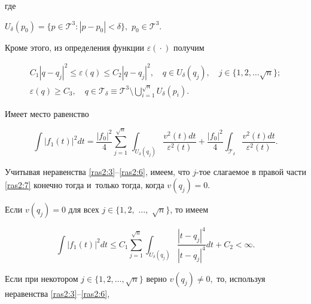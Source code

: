 где

$ U_\delta(p_0) = \{p \in {\mathcal T}^3 : |p-p_0| < \delta\},$ $p_0 \in {\mathcal T}^3$.





Кроме этого, из определения функции $\varepsilon({}\cdot{})$ получим

\begin{gather}

C_1|q-q_j|^2 \leq \varepsilon(q) \leq C_2|q-q_j|^2,\quad q\in U_\delta(q_j),\quad j\in \{1, 2, \dots \sqrt{n}\};

\label{ras2:5}

\\

\varepsilon(q)\geq C_3,\quad q\in {\mathcal T}_{\delta} \equiv {\mathcal T}^3 \setminus \bigcup\limits_{i=1}^{\sqrt{n}} U_\delta(p_i).

\label{ras2:6}

\end{gather}



Имеет место равенство

\begin{equation}

\int |f_1(t)|^2dt=\frac{|f_0|^2}{4} \sum_{j=1}^{\sqrt{n}}\,

\int_{U_\delta(q_j)} \frac{v^2(t)dt}{\varepsilon^2(t)}+

\frac{|f_0|^2}{4} \int_{{\mathcal T}_\delta}

\frac{v^2(t)dt}{\varepsilon^2(t)}.

\label{ras2:7}

\end{equation}



Учитывая неравенства \eqref{ras2:3}--\eqref{ras2:6}, имеем, что $j$-тое слагаемое в правой части \eqref{ras2:7} конечно тогда и~только тогда, когда $v(q_j)= 0.$ 

Если $v(q_j)=0$ для всех $j\in \{1, 2,$ $\dots, $ $ {\sqrt{n}}\}$, то   имеем

$$

\int |f_1(t)|^2dt \leq C_1 \sum_{j=1}^{\sqrt{n}} \int_{U_\delta(q_j)} \frac{|t-q_j|^4}{|t-q_j|^4}dt+C_2<\infty.

$$



Если при некотором $j\in \{1, 2, \dots, {\sqrt{n}}\}$ верно $v(q_j)\neq 0,$ то, используя неравенства \eqref{ras2:3}--\eqref{ras2:6},

